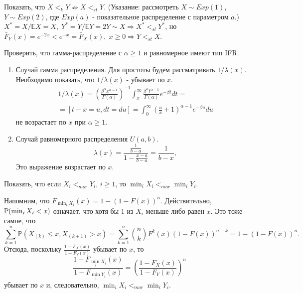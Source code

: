 \problem{}
Показать, что $X <_k Y \not\Rightarrow X <_{st} Y$. (Указание: рассмотреть $X \sim Exp(1)$, $Y \sim Exp(2)$, где $Exp(a)$ - показательное
распределение с параметром $a$.)
\solution{}
$X^* = X/\mathbb EX = X, \; Y^* = Y/\mathbb E Y = 2 Y \sim X \Rightarrow X^*<_{sl} Y^*$, но $\bar F_Y(x) = e^{-2x} < e^{-x} = \bar F_X(x), \; x\geq 0 \Rightarrow Y<_{st}X$.

\problem{}
Проверить, что гамма-распределение с $\alpha \geq 1$ и равномерное имеют тип IFR.
\solution{}
\begin{enumerate}
    \item Случай гамма распределения. Для простоты будем рассматривать $1/\lambda(x)$. Необходимо показать, что $1/\lambda(x) $ - убывает по $x$. 
    \begin{multline}
        1/\lambda(x) = \left( \frac{\beta^\alpha x^{\alpha - 1}}{\Gamma(\alpha)} \right)^{-1} \int_x^\infty \frac{\beta^\alpha t^{\alpha - 1}}{\Gamma(\alpha)}e^{-\beta t} dt =\\= \left[ t - x = u, dt = du \right] = \int_0^\infty \left(\frac{u}{x} + 1\right)^{\alpha -1}e^{-\beta u} du
    \end{multline}
        не возрастает по $x$ при $\alpha \geq 1$.

    \item Случай равномерного распределения $U(a,b)$.
    \begin{equation}
        \lambda(x) =\frac{\frac{1}{b-a}}{1 - \frac{x - a}{b - a}} =  \frac{1}{b - x},
    \end{equation}
    Это выражение возрастает по $x$.
\end{enumerate}

\problem{}
Показать, что если $X_i <_{mor} Y_i$, $i \geq 1$, то $\min_i X_i <_{mor} \min_i Y_i$.
\solution{}

Напомним, что $F_{\min_i X_i} (x) = 1 - (1 - F(x))^n$. Действительно, $\P( \min_i X_i < x) $ означает, что хотя бы 1 из $X_i$ меньше либо равен $x$. Это тоже самое, что
    \begin{equation}
        \sum_{k =1}^n \mathbb{P}(X_{(k)} \leq x, X_{(k+1)} > x ) =  \sum_{k=1}^n \binom{n}{k} F^k(x)(1 - F(x))^{n-k} = 1 - (1 - F(x))^n.
    \end{equation}
    Отсюда, поскольку $\frac{1 - F_X(x)}{1 - F_Y(x)}$ убывает по $x$, то 
    \begin{equation}
        \frac{1 - F_{\min_i X_i}(x)}{ 1 - F_{\min_i Y_i}(x)} = \left( \frac{1 - F_X(x)}{ 1 - F_Y(x)} \right)^n
    \end{equation}
    убывает по $x$ и, следовательно, $\min_i X_i <_{mor} \min_i Y_i$.